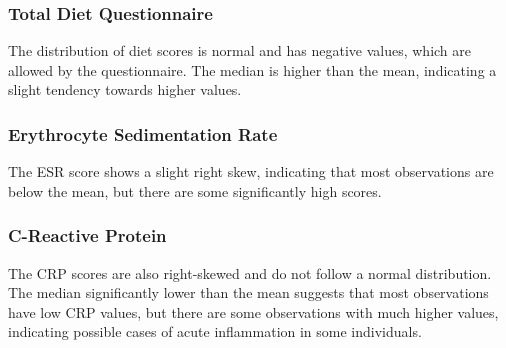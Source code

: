 \documentclass[jou]{apa7}
\begin{document}
\subsubsection{Total Diet Questionnaire}
The distribution of diet scores is normal and has negative values, which are allowed by the questionnaire. The median is higher than the mean, indicating a slight tendency towards higher values.

\subsubsection{Erythrocyte Sedimentation Rate}
The ESR score shows a slight right skew, indicating that most observations are below the mean, but there are some significantly high scores.

\subsubsection{C-Reactive Protein}
The CRP scores are also right-skewed and do not follow a normal distribution. The median significantly lower than the mean suggests that most observations have low CRP values, but there are some observations with much higher values, indicating possible cases of acute inflammation in some individuals.
\end{document}
